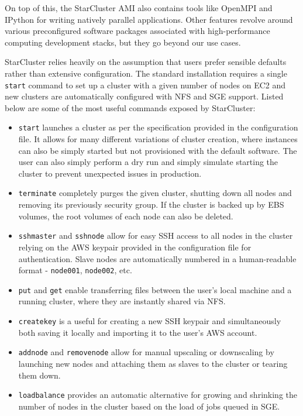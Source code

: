 On top of this, the StarCluster AMI also contains tools like OpenMPI \cite{OpenMPI} and IPython \cite{IPython} for writing natively parallel applications. Other features revolve around various preconfigured software packages associated with high-performance computing development stacks, but they go beyond our use cases.

StarCluster relies heavily on the assumption that users prefer sensible defaults rather than extensive configuration. The standard installation requires a single \verb|start| command to set up a cluster with a given number of nodes on EC2 and new clusters are automatically configured with NFS and SGE support. Listed below are some of the most useful commands exposed by StarCluster:
\begin{itemize}
	\item \verb|start| launches a cluster as per the specification provided in the configuration file. It allows for many different variations of cluster creation, where instances can also be simply started but not provisioned with the default software. The user can also simply perform a dry run and simply simulate starting the cluster to prevent unexpected issues in production.
	\item \verb|terminate| completely purges the given cluster, shutting down all nodes and removing its previously security group. If the cluster is backed up by EBS volumes, the root volumes of each node can also be deleted.
	\item \verb|sshmaster| and \verb|sshnode| allow for easy SSH access to all nodes in the cluster relying on the AWS keypair provided in the configuration file for authentication. Slave nodes are automatically numbered in a human-readable format - \verb|node001|, \verb|node002|, etc.
	\item \verb|put| and \verb|get| enable transferring files between the user's local machine and a running cluster, where they are instantly shared via NFS.
	\item \verb|createkey| is a useful for creating a new SSH keypair and simultaneously both saving it locally and importing it to the user's AWS account.
	\item \verb|addnode| and \verb|removenode| allow for manual upscaling or downscaling by launching new nodes and attaching them as slaves to the cluster or tearing them down.
	\item \verb|loadbalance| provides an automatic alternative for growing and shrinking the number of nodes in the cluster based on the load of jobs queued in SGE.
\end{itemize}

